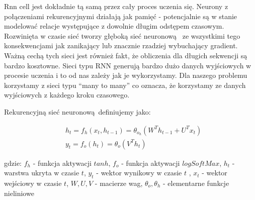 Rnn cell jest dokładnie tą samą przez cały proces
uczenia się. Neurony z połączeniami rekurencyjnymi działają jak pamięć - potencjalnie są w stanie modelować relacje
występujące z dowolnie długim odstępem czasowym. 
Rozwinięta w czasie sieć tworzy głęboką sieć neuronową 
ze wszystkimi tego konsekwencjami jak zanikający lub znacznie rzadziej wybuchający gradient. 
Ważną cechą tych sieci jest również fakt, że obliczenia dla długich sekwencji są bardzo kosztowne.
Sieci typu RNN generują bardzo dużo danych wyjściowych w procesie uczenia i to od nas zależy jak je 
wykorzystamy. Dla naszego problemu korzystamy z sieci typu ``many to many'' co oznacza, że korzystamy
ze danych wyjściowych z każdego kroku czasowego.

\newpage
Rekurencyjną sieć neuronową definiujemy jako:

\begin{align}
  &h_t = f_h(x_t, h_{t-1}) = \theta_o_h(W^Th_{t-1} + U^Tx_t) \\ 
  &y_t = f_o(h_t) = \theta_o(V^Th_t)
\end{align}

gdzie: \newline
$f_h$ - funkcja aktywacji $tanh$, \newline
$f_o$ - funkcja aktywacji $logSoftMax$, \newline
$h_t$ - warstwa ukryta w czasie $t$, \newline
$y_t$ - wektor wynikowy w czasie $t$ , \newline
$x_t$ - wektor wejściowy w czasie $t$, \newline
$W, U, V$ - macierze wag, \newline
$\theta_o, \theta_h$ - elementarne funkcje nieliniowe \newline


